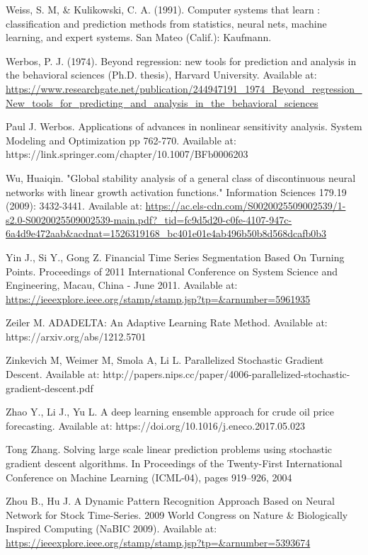 \documentclass[a4paper,11pt,oneside]{article}
\theoremstyle{plain}
\theoremstyle{definition}
\begin{document}
\begin{thebibliography}{bibliography}
Weiss, S. M, \& Kulikowski, C. A. (1991). Computer systems that learn : classification and prediction methods from statistics, neural nets, machine learning, and expert systems. San Mateo (Calif.): Kaufmann.

Werbos, P. J. (1974). Beyond regression: new tools for prediction and analysis in the behavioral sciences (Ph.D. thesis), Harvard 
University. Available at: \url{https://www.researchgate.net/publication/244947191_1974_Beyond_regression_New_tools_for_predicting_and_analysis_in_the_behavioral_sciences}

Paul J. Werbos. Applications of advances in nonlinear sensitivity analysis. 
System Modeling and Optimization pp 762-770. Available at: https://link.springer.com/chapter/10.1007/BFb0006203

Wu, Huaiqin. "Global stability analysis of a general class of discontinuous neural networks with linear growth activation functions." Information Sciences 179.19 (2009): 3432-3441.
Available at: \url{https://ac.els-cdn.com/S0020025509002539/1-s2.0-S0020025509002539-main.pdf?_tid=fc9d5d20-c0fe-4107-947c-6a4d9e472aab&acdnat=1526319168_bc401e01e4ab496b50b8d568dcafb0b3}

Yin J., Si Y., Gong Z. Financial Time Series Segmentation Based On Turning 
Points. Proceedings of 2011 International Conference on System Science and Engineering, Macau, China - June 
2011. Available at: \url{https://ieeexplore.ieee.org/stamp/stamp.jsp?tp=&arnumber=5961935}

Zeiler M. ADADELTA: An Adaptive Learning Rate Method. Available at: https://arxiv.org/abs/1212.5701

Zinkevich M, Weimer M, Smola A, Li L. Parallelized Stochastic Gradient Descent. 
Available at: 
http://papers.nips.cc/paper/4006-parallelized-stochastic-gradient-descent.pdf

Zhao Y., Li J., Yu L. A deep learning ensemble approach for crude oil price 
forecasting.  Available at: https://doi.org/10.1016/j.eneco.2017.05.023

Tong Zhang. Solving large scale linear prediction problems using stochastic gradient descent algorithms. In Proceedings of the Twenty-First International Conference on Machine Learning (ICML-04), pages 919–926, 2004

Zhou B., Hu J. A Dynamic Pattern Recognition Approach Based on Neural Network for Stock Time-Series. 2009 World Congress on Nature \& Biologically Inspired Computing (NaBIC 
2009). Available at:\url{ https://ieeexplore.ieee.org/stamp/stamp.jsp?tp=&arnumber=5393674}

\end{thebibliography}
\end{document}
